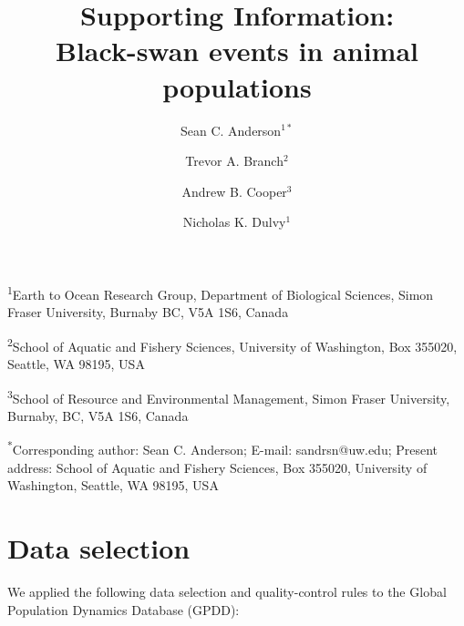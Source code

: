 \documentclass[12pt]{article}
\title{Supporting Information:\\Black-swan events in animal
  populations}
\author{
Sean C. Anderson$^{1*}$ \and
Trevor A. Branch$^2$ \and
Andrew B. Cooper$^3$ \and
Nicholas K. Dulvy$^1$
}
\date{}
\begin{document}


\maketitle

\textsuperscript{1}Earth to Ocean Research Group, Department of Biological
Sciences, Simon Fraser University, Burnaby BC, V5A 1S6, Canada

\textsuperscript{2}School of Aquatic and Fishery Sciences, University of
Washington, Box 355020, Seattle, WA 98195, USA

\textsuperscript{3}School of Resource and Environmental Management, Simon
Fraser University, Burnaby, BC, V5A 1S6, Canada

\textsuperscript{*}Corresponding author: Sean C. Anderson; E-mail: sandrsn@uw.edu; Present address: School of Aquatic and Fishery Sciences, Box 355020, University of Washington, Seattle, WA 98195, USA

\linenumbers
\onehalfspacing




\section{Data selection}

We applied the following data selection and quality-control rules to the
Global Population Dynamics Database (GPDD):
\end{document}
